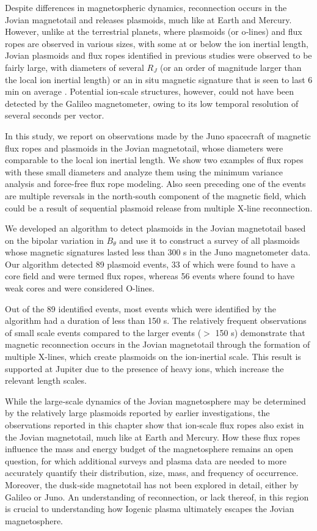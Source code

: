 Despite differences in magnetospheric dynamics, reconnection occurs in the Jovian magnetotail and releases plasmoids, much like at Earth and Mercury. However, unlike at the terrestrial planets, where plasmoids (or o‐lines) and flux ropes are observed in various sizes, with some at or below the ion inertial length, Jovian plasmoids and flux ropes identified in previous studies were observed to be fairly large, with diameters of several $R_J$ (or an order of magnitude larger than the local ion inertial length) or an in situ magnetic signature that is seen to last 6 min on average \cite{Vogt2014}. Potential ion‐scale structures, however, could not have been detected by the Galileo magnetometer, owing to its low temporal resolution of several seconds per vector.

In this study, we report on observations made by the Juno spacecraft of magnetic flux ropes and plasmoids in the Jovian magnetotail, whose diameters were comparable to the local ion inertial length. We show two examples of flux ropes with these small diameters and analyze them using the minimum variance analysis and force-free flux rope modeling. Also seen preceding one of the events are multiple reversals in the north‐south component of the magnetic field, which could be a result of sequential plasmoid release from multiple X‐line reconnection. 

We developed an algorithm to detect plasmoids in the Jovian magnetotail based on the bipolar variation in $B_\theta$ and use it to construct a survey of all plasmoids whose magnetic signatures lasted less than 300 s in the Juno magnetometer data. Our algorithm detected 89 plasmoid events, 33 of which were found to have a core field and were termed flux ropes, whereas 56 events where found to have weak cores and were considered O-lines. 

Out of the 89 identified events, most events which were identified by the algorithm had a duration of less than 150 s. The relatively frequent observations of small scale events compared to the larger events ($>$ 150 s) demonstrate that magnetic reconnection occurs in the Jovian magnetotail through the formation of multiple X-lines, which create plasmoids on the ion-inertial scale. This result is supported at Jupiter due to the presence of heavy ions, which increase the relevant length scales. 

While the large‐scale dynamics of the Jovian magnetosphere may be determined by the relatively large plasmoids reported by earlier investigations, the observations reported in this chapter show that ion‐scale flux ropes also exist in the Jovian magnetotail, much like at Earth and Mercury. How these flux ropes influence the mass and energy budget of the magnetosphere remains an open question, for which additional surveys and plasma data are needed to more accurately quantify their distribution, size, mass, and frequency of occurrence. Moreover, the dusk‐side magnetotail has not been explored in detail, either by Galileo or Juno. An understanding of reconnection, or lack thereof, in this region is crucial to understanding how Iogenic plasma ultimately escapes the Jovian magnetosphere.
